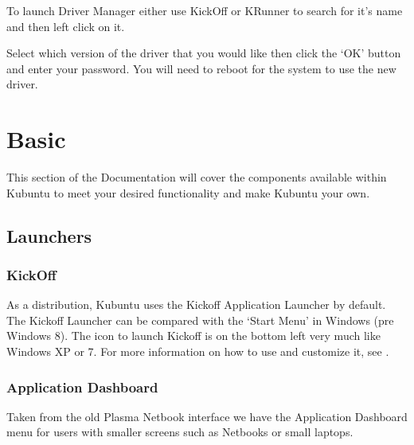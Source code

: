 \documentclass[letterpaper,10pt,english]{sphinxmanual}
\begin{document}
To launch Driver Manager either use KickOff or KRunner to search for it’s name and then left click on it.


Select which version of the driver that you would like then click the ‘OK’ button and enter your password. You will need to reboot for the system to use the new driver.


\chapter{Basic}
\label{\detokenize{docs/basic:basic}}\label{\detokenize{docs/basic:basic-link}}\label{\detokenize{docs/basic::doc}}
This section of the Documentation will cover the components available within Kubuntu to meet your desired functionality and make Kubuntu your own.


\section{Launchers}
\label{\detokenize{docs/basic:launchers}}

\subsection{KickOff}
\label{\detokenize{docs/basic:kickoff}}
As a  distribution, Kubuntu uses the Kickoff Application Launcher by default. The Kickoff Launcher can be compared with the ‘Start Menu’ in Windows (pre Windows 8). The icon to launch Kickoff is on the bottom left very much like Windows XP or 7. For more information on how to use and customize it, see .


\subsection{Application Dashboard}
\label{\detokenize{docs/basic:application-dashboard}}

Taken from the old Plasma Netbook interface we have the Application Dashboard menu for users with smaller screens such as Netbooks or small laptops.
\end{document}
